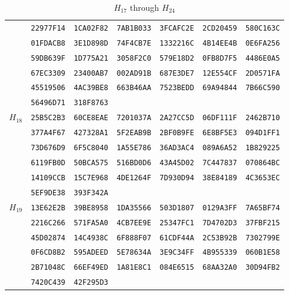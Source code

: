 \begin{table}\centering\caption{$H_{17}$ through $H_{24}$}
\begin{tabular}{@{}ccccccc@{}}\toprule\label{table:H32_3}
\multirow{6}{*}{$H_{17}$}
 & \texttt{22977F14} & \texttt{1CA02F82} & \texttt{7AB1B033} & \texttt{3FCAFC2E} & \texttt{2CD20459} & \texttt{580C163C}\\
 & \texttt{01FDACB8} & \texttt{3E1D898D} & \texttt{74F4CB7E} & \texttt{1332216C} & \texttt{4B14EE4B} & \texttt{0E6FA256}\\
 & \texttt{59DB639F} & \texttt{1D775A21} & \texttt{3058F2C0} & \texttt{579E18D2} & \texttt{0FB8D7F5} & \texttt{4486E0A5}\\
 & \texttt{67EC3309} & \texttt{23400AB7} & \texttt{002AD91B} & \texttt{687E3DE7} & \texttt{12E554CF} & \texttt{2D0571FA}\\
 & \texttt{45519506} & \texttt{4AC39BE8} & \texttt{663B46AA} & \texttt{7523BEDD} & \texttt{69A94844} & \texttt{7B66C590}\\
 & \texttt{56496D71} & \texttt{318F8763}\\

\midrule
\multirow{6}{*}{$H_{18}$}
 & \texttt{25B5C2B3} & \texttt{60CE8EAE} & \texttt{7201037A} & \texttt{2A27CC5D} & \texttt{06DF111F} & \texttt{2462B710}\\
 & \texttt{377A4F67} & \texttt{427328A1} & \texttt{5F2EAB9B} & \texttt{2BF0B9FE} & \texttt{6E8BF5E3} & \texttt{094D1FF1}\\
 & \texttt{73D676D9} & \texttt{6F5C8040} & \texttt{1A55E786} & \texttt{36AD3AC4} & \texttt{089A6A52} & \texttt{1B829225}\\
 & \texttt{6119FB0D} & \texttt{50BCA575} & \texttt{516BD0D6} & \texttt{43A45D02} & \texttt{7C447837} & \texttt{070864BC}\\
 & \texttt{14109CCB} & \texttt{15C7E968} & \texttt{4DE1264F} & \texttt{7D930D94} & \texttt{38E84189} & \texttt{4C3653EC}\\
 & \texttt{5EF9DE38} & \texttt{393F342A}\\

\midrule
\multirow{6}{*}{$H_{19}$}
 & \texttt{13E62E2B} & \texttt{39BE8958} & \texttt{1DA35566} & \texttt{503D1807} & \texttt{0129A3FF} & \texttt{7A65BF74}\\
 & \texttt{2216C266} & \texttt{571FA5A0} & \texttt{4CB7EE9E} & \texttt{25347FC1} & \texttt{7D4702D3} & \texttt{37FBF215}\\
 & \texttt{45D02874} & \texttt{14C4938C} & \texttt{6F888F07} & \texttt{61CDF44A} & \texttt{2C53B92B} & \texttt{7302799E}\\
 & \texttt{0F6CD8B2} & \texttt{595ADEED} & \texttt{5E78634A} & \texttt{3E9C34FF} & \texttt{4B955339} & \texttt{060B1E58}\\
 & \texttt{2B71048C} & \texttt{66EF49ED} & \texttt{1A81E8C1} & \texttt{084E6515} & \texttt{68AA32A0} & \texttt{30D94FB2}\\
 & \texttt{7420C439} & \texttt{42F295D3}\\


\end{tabular}
\end{table}
